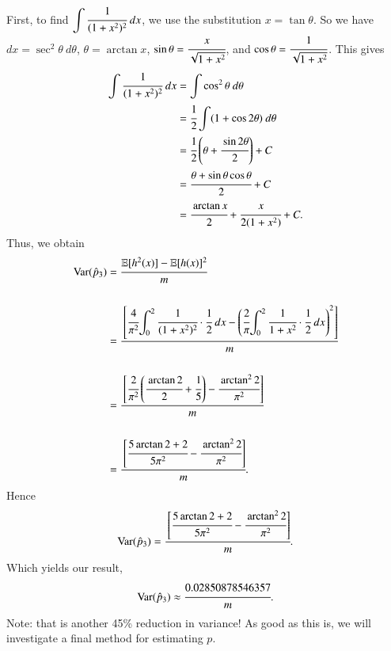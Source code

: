 \documentclass[captions=tableheading]{scrbook}
\begin{document}
First, to find ${\displaystyle \int\cfrac{1}{(1+x^{2})^{2}}\ dx}$, we use the substitution $x=\tan{\theta}$. So we have $dx=\sec^{2}{\theta}\ d\theta$, $\theta=\arctan{x}$, ${\displaystyle \sin{\theta}=\cfrac{x}{\sqrt{1+x^{2}}}}$, and ${\displaystyle \cos{\theta}=\cfrac{1}{\sqrt{1+x^{2}}}}$. This gives 
\begin{align*}
\int\cfrac{1}{(1+x^{2})^{2}}\ dx & =\int\cos^{2}{\theta}\ d\theta\\
 & =\cfrac{1}{2}\int(1+\cos{2\theta})\ d\theta\\
 & =\cfrac{1}{2}\left(\theta+\cfrac{\sin{2\theta}}{2}\right)+C\\
 & =\cfrac{\theta+\sin{\theta}\cos{\theta}}{2}+C\\
 & =\cfrac{\arctan{x}}{2}+\cfrac{x}{2(1+x^{2})}+C.
\end{align*}
Thus, we obtain
\begin{align*}
\text{Var}(\hat{p}_{3}) & =\cfrac{\mathbb{E}[h^{2}(x)]-\mathbb{E}[h(x)]^{2}}{m}\\
\\ & =\cfrac{\left[\cfrac{4}{\pi^{2}}{\displaystyle \int_{0}^{2}\cfrac{1}{(1+x^{2})^{2}}\cdot\cfrac{1}{2}\ dx}-\left(\cfrac{2}{\pi}{\displaystyle \int_{0}^{2}\cfrac{1}{1+x^{2}}\cdot\cfrac{1}{2}\ dx}\right)^{2}\right]}{m}\\
\\ & =\cfrac{\left[\cfrac{2}{\pi^{2}}\left(\cfrac{\arctan{2}}{2}+\cfrac{1}{5}\right)-\cfrac{\arctan^{2}{2}}{\pi^{2}}\right]}{m}\\
\\ & =\cfrac{\left[\cfrac{5\arctan{2}+2}{5\pi^{2}}-\cfrac{\arctan^{2}{2}}{\pi^{2}}\right]}{m}.
\end{align*}
Hence
\[
\text{Var}(\hat{p}_{3})=\cfrac{\left[\cfrac{5\arctan{2}+2}{5\pi^{2}}-\cfrac{\arctan^{2}{2}}{\pi^{2}}\right]}{m}.
\]
Which yields our result,
\[
\text{Var}(\hat{p}_{3})\approx\cfrac{0.02850878546357}{m}.
\]
Note: that is another 45\% reduction in variance! As good as this is, we will investigate a final method for estimating $p$.
\end{document}
